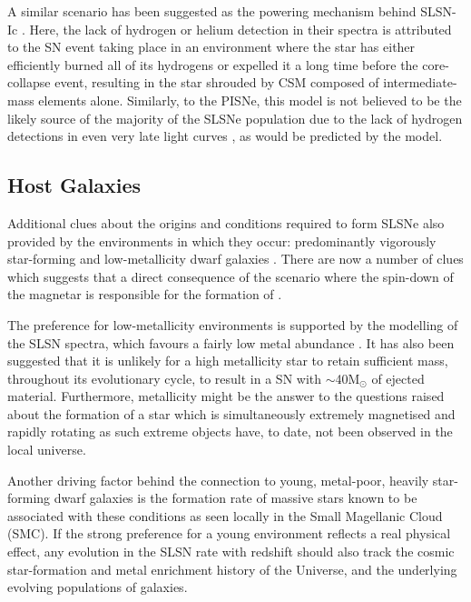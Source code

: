 A similar scenario has been suggested as the powering mechanism behind SLSN-Ic \citep{Chevalier2011}. Here, the lack of hydrogen or helium detection in their spectra is attributed to the SN event taking place in an environment where the star has either efficiently burned all of its hydrogens or expelled it a long time before the core-collapse event, resulting in the star shrouded by CSM composed of intermediate-mass elements alone. Similarly, to the PISNe, this model is not believed to be the likely source of the majority of the SLSNe population due to the lack of hydrogen detections in even very late light curves \citep{Jerkstrand2016}, as would be predicted by the model.

\subsection{Host Galaxies}
Additional clues about the origins and conditions required to form SLSNe also provided by the environments in which they occur: predominantly vigorously star-forming and low-metallicity dwarf galaxies \citep[e.g.,][]{Lunnan2014,Leloudas2015,Angus2016}. There are now a number of clues which suggests that  a direct consequence of the scenario where the spin-down of the magnetar is responsible for the formation of .

The preference for low-metallicity environments is supported by the modelling of the SLSN spectra, which favours a fairly low metal abundance \citep{Mazzali2015}. It has also been suggested \citep{Nomoto2016} that it is unlikely for a high metallicity star to retain sufficient mass, throughout its evolutionary cycle, to result in a SN with $\sim$40M$_{\odot}$ of ejected material. Furthermore, metallicity might be the answer to the questions raised about the formation of a star which is simultaneously extremely magnetised and rapidly rotating as such extreme objects have, to date, not been observed in the local universe.

Another driving factor behind the connection to young, metal-poor, heavily star-forming dwarf galaxies is the formation rate of massive stars known to be associated with these conditions as seen locally in the Small Magellanic Cloud (SMC). If the strong preference for a young environment reflects a real physical effect, any evolution in the SLSN rate with redshift should also track the cosmic star-formation and metal enrichment history of the Universe, and the underlying evolving populations of galaxies.

